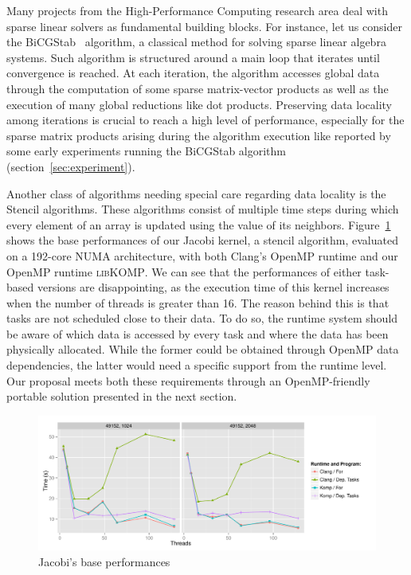 \documentclass{Styles/llncs}
\newcommand{\libXKOMP}{\textsc{libKOMP}\xspace}
\begin{document}
Many projects from the High-Performance Computing research area deal with sparse linear solvers as fundamental building blocks.
For instance, let us consider the BiCGStab~\cite{Saad:2003:IMS:829576} algorithm, a classical method for solving sparse linear algebra systems.  Such algorithm is structured around a main loop that iterates until convergence is reached. At each iteration, the algorithm accesses global data through the computation of some sparse matrix-vector products as well as the execution of many global reductions like dot products. Preserving data locality among iterations is crucial to reach a high level of performance, especially for the sparse matrix products arising during the algorithm execution like reported by some early experiments running the BiCGStab algorithm (section~\ref{sec:experiment}).

Another class of algorithms needing special care regarding data locality is the Stencil algorithms.
These algorithms consist of multiple time steps during which every element of an
array is updated using the value of its neighbors. Figure~\ref{fig:eval-jacobi-before} shows
the base performances of our Jacobi kernel, a stencil algorithm, evaluated on a
192-core NUMA architecture, with both Clang's OpenMP runtime and our OpenMP runtime \libXKOMP.
We can see that the performances of either task-based versions are disappointing,
as the execution time of this kernel increases when the number of threads is greater than 16.
The reason behind this is that tasks are not scheduled close to their data.
To do so, the runtime system should be aware of which data is accessed by every task
and where the data has been physically allocated. While the former could be obtained
through OpenMP data dependencies, the latter would need a specific support from the runtime level.
Our proposal meets both these requirements through an OpenMP-friendly portable solution presented in the next section.

\begin{figure}[htbp]
  \centering
  \includegraphics[scale=0.6]{graphs/jacobi_scale_iomp_komp.pdf}
  \caption{Jacobi's base performances}
\label{fig:eval-jacobi-before}
\end{figure}
\end{document}
